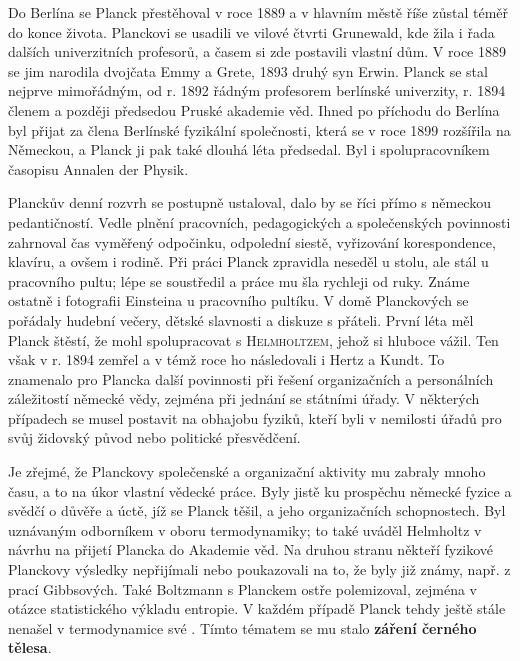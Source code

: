         Do Berlína se Planck přestěhoval v roce 1889 a v hlavním městě říše zůstal téměř do konce
        života. Planckovi se usadili ve vilové čtvrti Grunewald, kde žila i řada dalších
        univerzitních profesorů, a časem si zde postavili vlastní dům. V roce 1889 se jim narodila
        dvojčata Emmy a Grete, 1893 druhý syn Erwin. Planck se stal nejprve mimořádným, od r. 1892
        řádným profesorem berlínské univerzity, r. 1894 členem a později předsedou Pruské akademie
        věd. Ihned po příchodu do Berlína byl přijat za člena Berlínské fyzikální společnosti, která
        se v roce 1899 rozšířila na Německou, a Planck ji pak také dlouhá léta předsedal. Byl i
        spolupracovníkem časopisu Annalen der Physik.

        Planckův denní rozvrh se postupně ustaloval, dalo by se říci přímo s německou pedantičností.
        Vedle plnění pracovních, pedagogických a společenských povinnosti zahrnoval čas vyměřený
        odpočinku, odpolední siestě, vyřizování korespondence, klavíru, a ovšem i rodině. Při práci
        Planck zpravidla neseděl u stolu, ale stál u pracovního pultu; lépe se soustředil a práce mu
        šla rychleji od ruky. Známe ostatně i fotografii Einsteina u pracovního pultíku. V domě
        Planckových se pořádaly hudební večery, dětské slavnosti a diskuze s přáteli. První léta měl
        Planck štěstí, že mohl spolupracovat s \textsc{Helmholtzem}, jehož si hluboce vážil. Ten
        však v r. 1894 zemřel a v témž roce ho následovali i Hertz a Kundt. To znamenalo pro Plancka
        další povinnosti při řešení organizačních a personálních záležitostí německé vědy, zejména
        při jednání se státními úřady. V některých případech se musel postavit na obhajobu fyziků,
        kteří byli v nemilosti úřadů pro svůj židovský původ nebo politické přesvědčení.

        Je zřejmé, že Planckovy společenské a organizační aktivity mu zabraly mnoho času, a to na
        úkor vlastní vědecké práce. Byly jistě ku prospěchu německé fyzice a svědčí o důvěře a úctě,
        jíž se Planck těšil, a jeho organizačních schopnostech. Byl uznávaným odborníkem v oboru
        termodynamiky; to také uváděl Helmholtz v návrhu na přijetí Plancka do Akademie věd. Na
        druhou stranu někteří fyzikové Planckovy výsledky nepřijímali nebo poukazovali na to, že
        byly již známy, např. z prací Gibbsových. Také Boltzmann s Planckem ostře polemizoval,
        zejména v otázce statistického výkladu entropie. V každém případě Planck tehdy ještě stále
        nenašel v termodynamice své . Tímto tématem se mu stalo \textbf{záření
        černého tělesa}.

